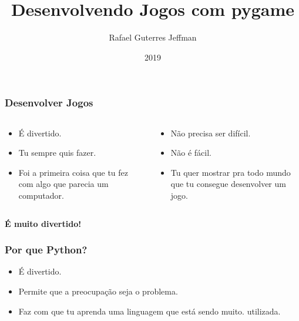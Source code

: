 



\title{Desenvolvendo Jogos com pygame}
\subtitle{}
\author{Rafael Guterres Jeffman}
\institute{}
\date{2019}



\coverframe

\begin{frame}
    \frametitle{Desenvolver Jogos}

    \begin{columns}
        \begin{column}{0.5\textwidth}
            \begin{itemize}
                \item É divertido.
                \item Tu sempre quis fazer.
                \item Foi a primeira coisa que tu fez com algo que parecia
                um computador.
            \end{itemize}
        \end{column}
        \begin{column}{0.5\textwidth}
            \begin{itemize}
                \item Não precisa ser difícil.
                \item Não é fácil.
                \item Tu quer mostrar pra todo mundo que tu consegue
                desenvolver um jogo.
            \end{itemize}
        \end{column}
    \end{columns}
    \begin{center}
        \item {\Large \textbf{É muito divertido!}}
    \end{center}
\end{frame}

\begin{frame}
    \frametitle{Por que Python?}

    \begin{itemize}
        \item É divertido.
        \item Permite que a preocupação seja o problema.
        \item Faz com que tu aprenda uma linguagem que está sendo muito.
        utilizada.
    \end{itemize}
\end{frame}

